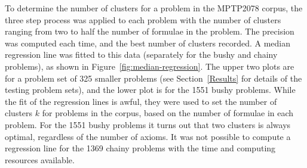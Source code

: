 \documentclass[EPiC]{easychair}
\begin{document}
To determine the number of clusters for a problem in the MPTP2078 corpus,
the three step process was applied to each problem with the number of 
clusters ranging from two to half the number of formulae in the problem.
The precision was computed each time, and the best number of clusters
recorded.
A median regression line was fitted to this data (separately for the
bushy and chainy problems), as shown in Figure~\ref{fig:median-regression}.
The upper two plots are for a problem set of 325 smaller problems (see
Section~\ref{Results} for details of the testing problem sets), and the
lower plot is for the 1551 bushy problems.
While the fit of the regression lines is awful, they were used to set the 
number of clusters $k$ for problems in the corpus, based on the number of 
formulae in each problem.
For the 1551 bushy problems it turns out that two clusters is always optimal,
regardless of the number of axioms.
It was not possible to compute a regression line for the 1369 chainy
problems with the time and computing resources available.
\end{document}
